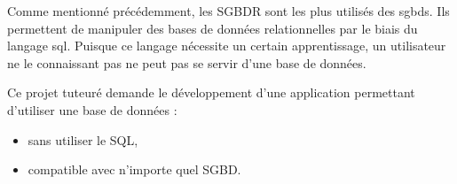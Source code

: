 Comme mentionné précédemment, les SGBDR sont les plus utilisés des \glspl{sgbd}. Ils permettent de manipuler des bases de données relationnelles
par le biais du langage \gls{sql}. Puisque ce langage nécessite un certain apprentissage, un utilisateur ne le connaissant pas ne peut pas se servir
d'une base de données.

Ce projet tuteuré demande le développement d'une application permettant d'utiliser une base de données :
\begin{itemize}
\item sans utiliser le SQL,
\item compatible avec n'importe quel SGBD.
\end{itemize}
